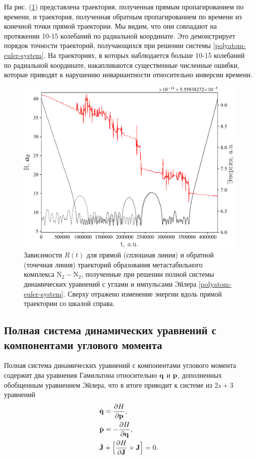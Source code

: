 На рис. (\ref{fig:euler-trajectory}) представлена траектория, полученная прямым пропагированием по времени, и траектория, полученная обратным пропагированием по времени из конечной точки прямой траектории. Мы видим, что они совпадают на протяжении 10-15 колебаний по радиальной координате. Это демонстрирует порядок точности траекторий, получающихся при решении системы \eqref{polyatom-euler-system}. На траекториях, в которых наблюдается больше 10-15 колебаний по радиальной координате, накапливаются существенные численные ошибки, которые приводят к нарушению инвариантности относительно инверсии времени.

\begin{figure}[H]
    \centering
    \includegraphics[width=0.75\linewidth]{./pictures/trajectories/euler_trajectory-crop.pdf}
\caption{Зависимости $R(t)$ для прямой (сплошная линия) и обратной (точечная линия) траекторий образования метастабильного комплекса N$_2-$N$_2$, полученные при решении полной системы динамических уравнений с углами и импульсами Эйлера \eqref{polyatom-euler-system}. Сверху отражено изменение энергии вдоль прямой траектории со шкалой справа.}
    \label{fig:euler-trajectory}
\end{figure}

\subsection{Полная система динамических уравнений с компонентами углового момента}
    Полная система динамических уравнений с компонентами углового момента содержит два уравнения Гамильтона относительно $\mathbf{q}$ и $\mathbf{p}$, дополненных обобщенным уравнением Эйлера, что в итоге приводит к системе из $2s + 3$ уравнений
\begin{gather}
    \begin{aligned}
        &\dot{\mathbf{q}} = \frac{\partial H}{\partial \mathbf{p}}, \\
        &\dot{\mathbf{p}} = -\frac{\partial H}{\partial \mathbf{q}}, \\
        &\dot{\mathbf{J}} + \Big[ \frac{\partial H}{\partial \mathbf{J}} \times \mathbf{J} \Big] = 0.
    \end{aligned}
\end{gather}


